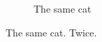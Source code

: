 \begin{figure}[h!]
\begin{subfigure}[b]{0.4\linewidth}
    \caption{The same cat}
  \end{subfigure}
  \caption{The same cat. Twice.}
  \label{fig:coffee}
\end{figure}